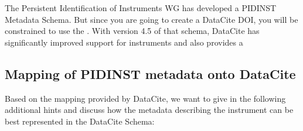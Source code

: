 \documentclass[a4paper,10pt,english]{sphinxmanual}
\begin{document}
\sphinxAtStartPar
The Persistent Identification of Instruments WG has developed a
PIDINST Metadata Schema.  But since you are going to create a DataCite
DOI, you will be constrained to use the .
With version 4.5 of that schema, DataCite has significantly improved
support for instruments and also provides a 


\subsection{Mapping of PIDINST metadata onto DataCite}
\label{\detokenize{datacite-cookbook/metadata:mapping-of-pidinst-metadata-onto-datacite}}
\sphinxAtStartPar
Based on the mapping provided by DataCite, we want to give in the
following additional hints and discuss how the metadata describing the
instrument can be best represented in the DataCite Schema:
\end{document}
